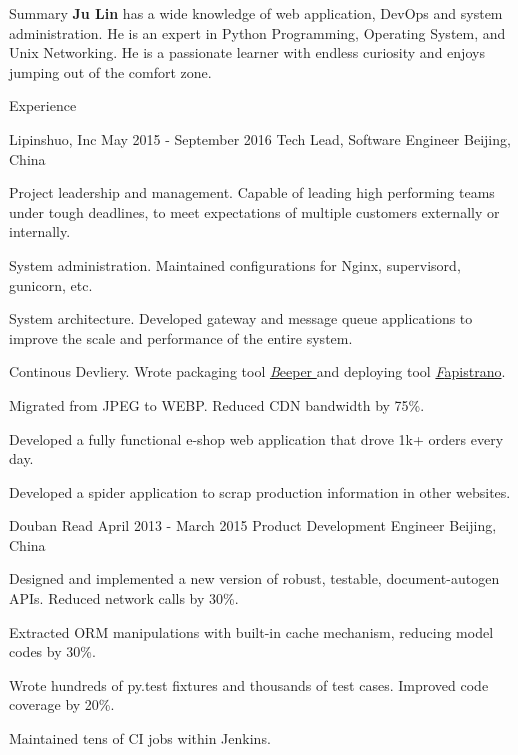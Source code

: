 \documentclass{resume}
\begin{document}
  \begin{rSection}{Summary}
    { {\bf Ju Lin } has a wide knowledge of web application, DevOps and system administration. He is an expert in Python Programming, Operating System, and Unix Networking. He is a passionate learner with endless curiosity and enjoys jumping out of the comfort zone. }
  \end{rSection}

  \begin{rSection}{Experience}

    \begin{rSubsection}{Lipinshuo, Inc}{ May 2015 - September 2016 }{Tech Lead, Software Engineer }{Beijing, China}
    \item Project leadership and management. Capable of leading high performing teams under tough deadlines, to meet expectations of multiple customers externally or internally.
    \item System administration. Maintained configurations for Nginx, supervisord, gunicorn, etc.
    \item System architecture. Developed gateway and message queue applications to improve the scale and performance of the entire system.
    \item Continous Devliery. Wrote packaging tool \href{https://github.com/soasme/beeper.py}{\textit Beeper } and deploying tool \href{https://github.com/liwushuo/fapistrano}{\textit Fapistrano}.
    \item Migrated from JPEG to WEBP. Reduced CDN bandwidth by 75\%.
    \item Developed a fully functional e-shop web application that drove 1k+ orders every day.
    \item Developed a spider application to scrap production information in other websites.
    \end{rSubsection}

    \begin{rSubsection}{ Douban Read }{ April 2013 - March 2015 }{ Product Development Engineer }{Beijing, China}
    \item Designed and implemented a new version of robust, testable, document-autogen APIs. Reduced network calls by 30\%.
    \item Extracted ORM manipulations with built-in cache mechanism, reducing model codes by 30\%.
    \item Wrote hundreds of py.test fixtures and thousands of test cases. Improved code coverage by 20\%.
    \item Maintained tens of CI jobs within Jenkins.
    \end{rSubsection}


\end{rSection}
\end{document}
